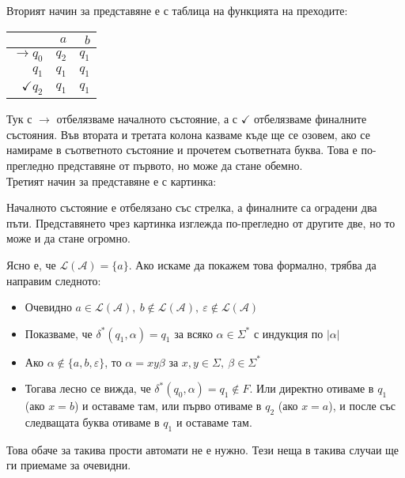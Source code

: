 Вторият начин за представяне е с таблица на функцията на преходите:
\begin{center}
    \begin{tabular}{||r | r | r||}
        \hline
        \cellcolor{lightgray} & $a$   & $b$   \\
        \hline
        $\rightarrow q_0$     & $q_2$ & $q_1$ \\
        \hline
        $q_1$                 & $q_1$ & $q_1$ \\
        \hline
        $\checkmark q_2$      & $q_1$ & $q_1$ \\
        \hline
    \end{tabular}
\end{center}
Тук с $\rightarrow$ отбелязваме началното състояние,
а с $\checkmark$ отбелязваме финалните състояния.
Във втората и третата колона казваме къде ще се озовем,
ако се намираме в съответното състояние и прочетем съответната буква.
Това е по-прегледно представяне от първото, но може да стане обемно. \\

Третият начин за представяне е с картинка:

\begin{center}
\end{center}

Началното състояние е отбелязано със стрелка, а финалните са оградени два пъти.
Представянето чрез картинка изглежда по-прегледно от другите две, но то може и да стане огромно.

Ясно е, че $\mathcal{L}(\mathcal{A}) = \{ a \}$.
Ако искаме да покажем това формално, трябва да направим следното:
\begin{itemize}
    \item Очевидно $a \in \mathcal{L}(\mathcal{A}), \: b \notin \mathcal{L}(\mathcal{A}), \: \varepsilon \notin \mathcal{L}(\mathcal{A})$
    \item Показваме, че $\delta^*(q_1, \alpha) = q_1$ за всяко $\alpha \in \Sigma^*$ с индукция по $|\alpha|$
    \item Ако $\alpha \notin \{ a, b, \varepsilon \}$, то $\alpha = x y \beta$ за $x, y \in \Sigma, \: \beta \in \Sigma^*$
    \item Тогава лесно се вижда, че $\delta^*(q_0, \alpha) = q_1 \notin F$.
          Или директно отиваме в $q_1$ (ако $x = b$) и оставаме там, или първо отиваме в $q_2$ (ако $x = a$), и после със следващата буква отиваме в $q_1$ и оставаме там.
\end{itemize}

Това обаче за такива прости автомати не е нужно.
Тези неща в такива случаи ще ги приемаме за очевидни.